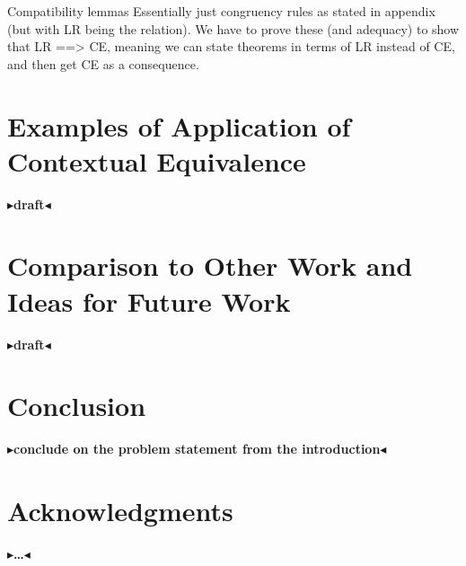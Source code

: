 \documentclass[twoside,11pt,openright]{report}
\theoremstyle{definition}
\newcommand{\expr}{e}
\newcommand{\TT}{()}
\newcommand{\Tunit}{\mathsf{Unit}}
\newcommand{\Tint}{\mathbb{Z}}
\newcommand{\venv}{\Gamma}
\newcommand{\tenv}{\Xi}
\def\envsrel#1#2\exp1#3 \rel#4 \exp2#5\type#6
\newcommand{\todo}[1]{{\color[rgb]{.5,0,0}\textbf{$\blacktriangleright$#1$\blacktriangleleft$}}}
\begin{document}
Compatibility lemmas
Essentially just congruency rules as stated in appendix (but with LR being the relation). We have to prove these (and adequacy) to show that LR ==> CE, meaning we can state theorems in terms of LR instead of CE, and then get CE as a consequence.



\chapter{Examples of Application of Contextual Equivalence}
\label{ch:ACE}

\todo{draft}


\chapter{Comparison to Other Work and Ideas for Future Work}
\label{ch:COWFW}

\todo{draft}


\chapter{Conclusion}
\label{ch:conclusion}

\todo{conclude on the problem statement from the introduction}

\chapter*{Acknowledgments}

\todo{\dots}

\end{document}
